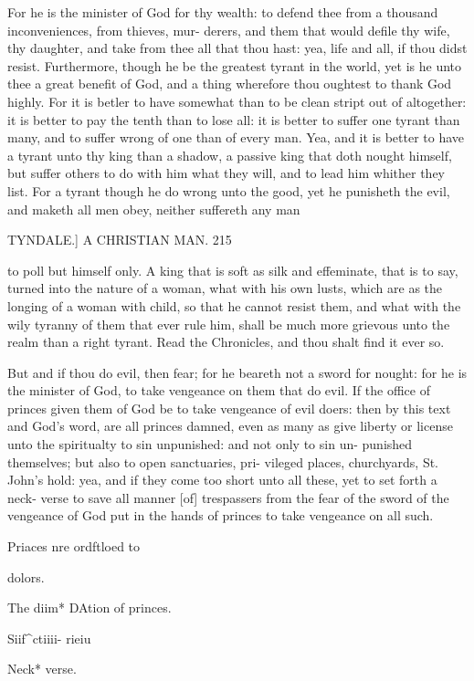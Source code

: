 \documentclass{custom}
\begin{document}
For he is the minister of God for thy wealth: to defend 
thee from a thousand inconveniences, from thieves, mur- 
derers, and them that would defile thy wife, thy daughter, 
and take from thee all that thou hast: yea, life and all, 
if thou didst resist. Furthermore, though he be the 
greatest tyrant in the world, yet is he unto thee a great 
benefit of God, and a thing wherefore thou oughtest to 
thank God highly. For it is betler to have somewhat 
than to be clean stript out of altogether: it is better 
to pay the tenth than to lose all: it is better to 
suffer one tyrant than many, and to suffer wrong of one 
than of every man. Yea, and it is better to have a tyrant 
unto thy king than a shadow, a passive king that doth 
nought himself, but suffer others to do with him what they 
will, and to lead him whither they list. For a tyrant 
though he do wrong unto the good, yet he punisheth the 
evil, and maketh all men obey, neither suffereth any man 


TYNDALE.]
A CHRISTIAN MAN.
215

to poll but himself only. A king that is soft as silk and 
effeminate, that is to say, turned into the nature of a 
woman, what with his own lusts, which are as the longing 
of a woman with child, so that he cannot resist them, and 
what with the wily tyranny of them that ever rule him, shall 
be much more grievous unto the realm than a right tyrant. 
Read the Chronicles, and thou shalt find it ever so.

But and if thou do evil, then fear; for he beareth not 
a sword for nought: for he is the minister of God, to 
take vengeance on them that do evil. If the office of 
princes given them of God be to take vengeance of evil 
doers: then by this text and God's word, are all princes 
damned, even as many as give liberty or license unto the 
spiritualty to sin unpunished: and not only to sin un- 
punished themselves; but also to open sanctuaries, pri- 
vileged places, churchyards, St. John's hold: yea, and if 
they come too short unto all these, yet to set forth a neck- 
verse to save all manner [of] trespassers from the fear of the 
sword of the vengeance of God put in the hands of princes 
to take vengeance on all such. 

Priaces nre 
ordftloed to 

dolors. 

The diim* 
DAtion of 
princes. 

Siif^ctiiii- 
rieiu 

Neck* 
verse. 
\end{document}
